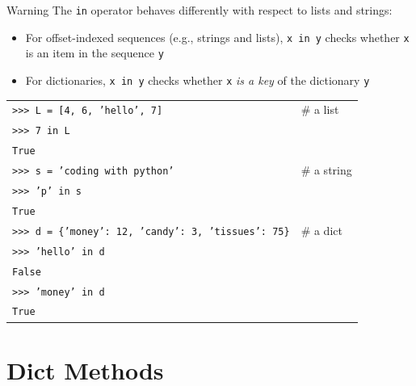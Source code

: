 \documentclass[t,handout,9pt]{beamer}
\begin{document}
\begin{frame}
\vfill
\begin{block}{Warning}
The \texttt{in} operator behaves differently with respect to lists and strings:
\begin{itemize}
	\item For offset-indexed sequences (e.g., strings and lists), \texttt{x in y} checks whether \texttt{x} is an item in the sequence \texttt{y}
	\item For dictionaries, \texttt{x in y} checks whether \texttt{x} \textit{is a key} of the dictionary \texttt{y}
\end{itemize}
\end{block}
\begin{table}[]
\begin{flushleft}
\begin{tabular}{ll}
\texttt{>{}>{}> L = [4, 6, 'hello', 7]} &  \# a list\\
\texttt{>{}>{}> 7 in L} & \\
\texttt{True} &  \\
\texttt{>{}>{}> s = 'coding with python'} &  \# a string\\
\texttt{>{}>{}> 'p' in s} & \\
\texttt{True} &  \\
\texttt{>{}>{}> d = \{'money': 12, 'candy': 3, 'tissues': 75\}} &  \# a dict\\
\texttt{>{}>{}> 'hello' in d} & \\
\texttt{False} &  \\
\texttt{>{}>{}> 'money' in d} & \\
\texttt{True} &  \\
\end{tabular}
\end{flushleft}
\end{table}
\vfill
\end{frame}
\section{Dict Methods}
\end{document}
